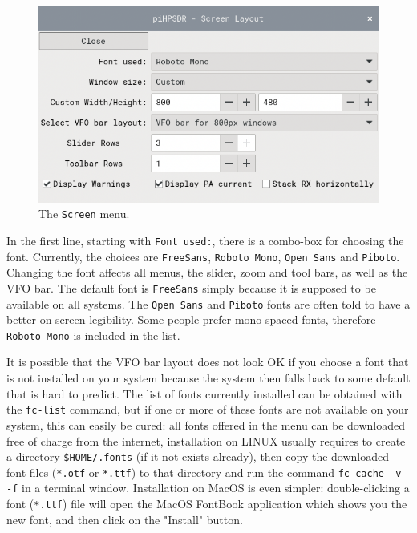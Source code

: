 \documentclass[12pt]{book}
\def\rett#1{\texttt{\color{red}#1}}
\def\bltt#1{\texttt{\color{blue}#1}}
\begin{document}
\begin{figure}[ht]
\center
\includegraphics[scale=0.35]{ScreenMenu.png}
\caption{The \bltt{Screen} menu.}
\label{fig:ScreenMenu}
\end{figure}

In the first line, starting with \rett{Font used:},
 there is a combo-box for choosing the font. Currently, the choices
are \rett{FreeSans}, \rett{Roboto Mono}, \rett{Open Sans} and \rett{Piboto}. Changing
the font affects all menus, the slider, zoom and tool bars, as well as the VFO bar.
The default font is \rett{FreeSans} simply because it is supposed to be available on all
systems. The \rett{Open Sans} and \rett{Piboto} fonts are often told to have a
better on-screen legibility. Some people prefer mono-spaced fonts, therefore \rett{Roboto Mono}
is included in the list.

It is possible that the VFO bar layout does not look OK if you choose a font
that is not installed on your system because the system then falls back to some
default that is hard to predict. The list of fonts currently installed can be
obtained with the \texttt{fc-list} command, but
if one or more of these fonts are not available on your system, this can easily be
cured: all fonts offered in the menu can be downloaded
free of charge from the internet, installation on LINUX usually requires to create
a directory \texttt{\$HOME/.fonts} (if it not exists already), then copy the downloaded
font files (\texttt{*.otf} or \texttt{*.ttf}) to that directory and run the command
\texttt{fc-cache -v -f} in a terminal window. Installation on MacOS is even simpler:
double-clicking a font  (\texttt{*.ttf}) file will open the MacOS FontBook application
which shows you the new font, and then click on the "Install" button.
\end{document}
